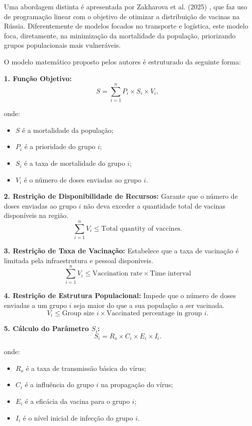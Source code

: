 Uma abordagem distinta é apresentada por Zakharova et al. (2025) \cite{zakharova2025optimal}, que faz uso de programação linear com o objetivo de otimizar a distribuição de vacinas na Rússia. Diferentemente de modelos focados no transporte e logística, este modelo foca, diretamente, na minimização da mortalidade da população, priorizando grupos populacionais mais vulneráveis.

O modelo matemático proposto pelos autores é estruturado da seguinte forma:

\textbf{1. Função Objetivo:}
\[
S = \sum_{i=1}^{n} P_i \times S_i \times V_i,
\]

onde:
\begin{itemize}
    \item $S$ é a mortalidade da população;
    \item $P_i$ é a prioridade do grupo $i$;
    \item $S_i$ é a taxa de mortalidade do grupo $i$;
    \item $V_i$ é o número de doses enviadas ao grupo $i$.
\end{itemize}

\textbf{2. Restrição de Disponibilidade de Recursos:}
Garante que o número de doses enviadas ao grupo $i$ não deva exceder a quantidade total de vacinas disponíveis na região.
\[
\sum_{i=1}^{n} V_i \leq \text{Total quantity of vaccines.}
\]

\textbf{3. Restrição de Taxa de Vacinação:}
Estabelece que a taxa de vacinação é limitada pela infraestrutura e pessoal disponíveis.
\[
\sum_{i=1}^{n} V_i \leq \text{Vaccination rate} \times \text{Time interval}
\]

\textbf{4. Restrição de Estrutura Populacional:}
Impede que o número de doses enviadas a um grupo $i$ seja maior do que a sua população a ser vacinada.
\[
V_i \leq \text{Group size } i \times \text{Vaccinated percentage in group } i.
\]

\textbf{5. Cálculo do Parâmetro $S_i$:}
\[
S_i = R_o \times C_i \times E_i \times I_i.
\]

onde:
\begin{itemize}
    \item $R_o$ é a taxa de transmissão básica do vírus;
    \item $C_i$ é a influência do grupo $i$ na propagação do vírus;
    \item $E_i$ é a eficácia da vacina para o grupo $i$;
    \item $I_i$ é o nível inicial de infecção do grupo $i$.
\end{itemize}

